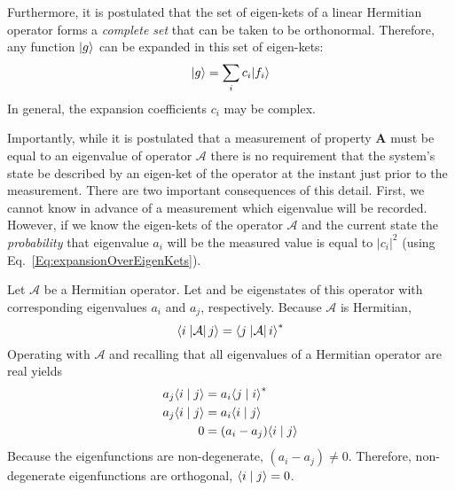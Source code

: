 Furthermore, it is postulated that the set of eigen-kets of a linear Hermitian
operator forms a \emph{complete set} that can be taken to be orthonormal.
Therefore, any function $\ket{g}$ can be expanded in this set of eigen-kets:
%
\begin{equation}\label{Eq:expansionOverEigenKets}
\displaystyle
  \ket{g} = \sum_i{c_i\ket{f_i}}
\end{equation}
%
In general, the expansion coefficients ${c_i}$ may be complex.

Importantly, while it is postulated that a measurement of property $\mathbf{A}$ must be equal to an eigenvalue of operator $\mathcal{A}$ there is no requirement that the system's state be described by an eigen-ket of the operator at the instant just prior to the measurement. There are two important consequences of this detail. First, we cannot know in advance of a measurement which eigenvalue will be recorded. However, if we know the eigen-kets of the operator $\mathcal{A}$ and the current state  the \emph{probability} that eigenvalue $a_i$ will be the measured value is equal to $\left| c_i \right|^2$ (using Eq.~\ref{Eq:expansionOverEigenKets}).

%
\begin{hphproof}
Let $\mathcal{A}$ be a Hermitian operator. Let  and  be eigenstates of this operator with corresponding eigenvalues $a_i$ and $a_j$, respectively. Because $\mathcal{A}$ is Hermitian,
%
\begin{equation*}
\displaystyle
  \braketop{i}{\mathcal{A}}{j} = \braketop{j}{\mathcal{A}}{i}^*
\end{equation*}
%
Operating with $\mathcal{A}$ and recalling that all eigenvalues of a Hermitian operator are real yields
%
\begin{equation*}
\displaystyle
\begin{split}
  a_j\braket{i}{j} ={}& a_i\braket{j}{i}^*   \\
  a_j\braket{i}{j} ={}& a_i\braket{i}{j}   \\
  0 ={}& \left(a_i - a_j\right) \braket{i}{j}
\end{split}
\end{equation*}
%
Because the eigenfunctions are non-degenerate, $(a_i-a_j)\ne{}0$. Therefore, non-degenerate eigenfunctions are orthogonal, $\braket{i}{j}=0$.
%
\qedfilled
\end{hphproof}
%

